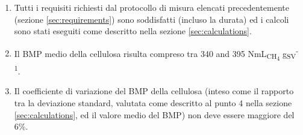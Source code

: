 \documentclass[]{article}
\begin{document}
\begin{enumerate}
  \item Tutti i requisiti richiesti dal protocollo di misura elencati precedentemente (sezione \ref{sec:requirements}) sono soddisfatti (incluso la durata) ed i calcoli sono stati eseguiti come descritto nella sezione \ref{sec:calculations}.
  \item Il BMP medio della cellulosa risulta compreso tra 340 and 395 NmL\textsubscript{CH\textsubscript{4}} g\textsubscript{SV}\textsuperscript{-1}.
  \item Il coefficiente di variazione del BMP della cellulosa (inteso come il rapporto tra la deviazione standard, valutata come descritto al punto 4 nella sezione \ref{sec:calculations}, ed il valore medio del BMP) non deve essere maggiore del 6\%.
\end{enumerate}


\end{document}
